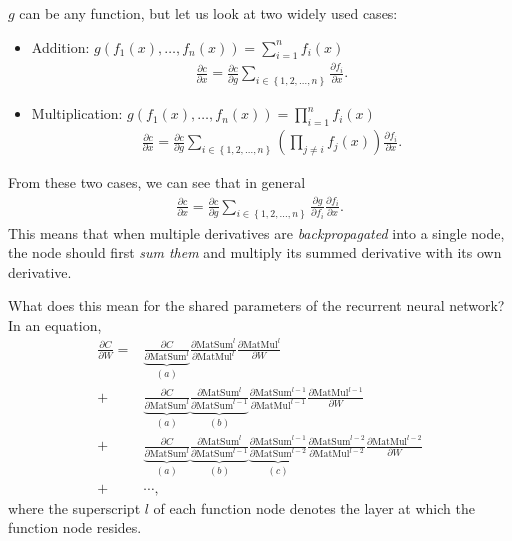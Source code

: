 \documentclass{report}
\newcommand{\MatSum}{\text{MatSum}}
\newcommand{\MatMul}{\text{MatMul}}
\begin{document}
$g$ can be any function, but let us look at two widely used cases:
\begin{itemize}
    \item Addition: $g(f_1(x), \ldots, f_n(x)) = \sum_{i=1}^n f_i(x)$
        \begin{align*}
            \frac{\partial c}{\partial x} = \frac{\partial c}{\partial g} 
            \sum_{i \in \left\{ 1, 2, \ldots, n\right\}} 
            \frac{\partial f_i}{\partial x}.
        \end{align*}
    \item Multiplication: $g(f_1(x), \ldots, f_n(x)) = \prod_{i=1}^n f_i(x)$
        \begin{align*}
            \frac{\partial c}{\partial x} = \frac{\partial c}{\partial g} 
            \sum_{i \in \left\{ 1, 2, \ldots, n\right\}} 
            \left(\prod_{j \neq i} f_j(x)\right)
            \frac{\partial f_i}{\partial x}.
        \end{align*}
\end{itemize}

From these two cases, we can see that in general
\begin{align*}
    \frac{\partial c}{\partial x} = \frac{\partial c}{\partial g} 
    \sum_{i \in \left\{ 1, 2, \ldots, n\right\}} 
    \frac{\partial g}{\partial f_i}
    \frac{\partial f_i}{\partial x}.
\end{align*}
This means that when multiple derivatives are {\em backpropagated} into a single
node, the node should first {\em sum them} and multiply its summed derivative
with its own derivative.

What does this mean for the shared parameters of the recurrent neural network?
In an equation,
\begin{align}
    \label{eq:bptt}
    \frac{\partial C}{\partial W} =&
    \underbrace{
        \frac{\partial C}{\partial \MatSum^l}
    }_{(a)}
    \frac{\partial \MatSum^l}{\partial \MatMul^l}
    \frac{\partial \MatMul^l}{\partial W} \\
    +& 
    \underbrace{
        \frac{\partial C}{\partial \MatSum^l}
    }_{(a)}
    \underbrace{
        \frac{\partial \MatSum^l}{\partial \MatSum^{l-1}}
    }_{(b)}
    \frac{\partial \MatSum^{l-1}}{\partial \MatMul^{l-1}}
    \frac{\partial \MatMul^{l-1}}{\partial W} 
    \nonumber \\
    +& 
    \underbrace{
        \frac{\partial C}{\partial \MatSum^l}
    }_{(a)}
    \underbrace{
        \frac{\partial \MatSum^l}{\partial \MatSum^{l-1}}
    }_{(b)}
    \underbrace{
        \frac{\partial \MatSum^{l-1}}{\partial \MatSum^{l-2}}
    }_{(c)}
    \frac{\partial \MatSum^{l-2}}{\partial \MatMul^{l-2}}
    \frac{\partial \MatMul^{l-2}}{\partial W} 
    \nonumber \\
    +& 
    \cdots,
    \nonumber
\end{align}
where the superscript $l$ of each function node denotes the layer at which the
function node resides. 
\end{document}
